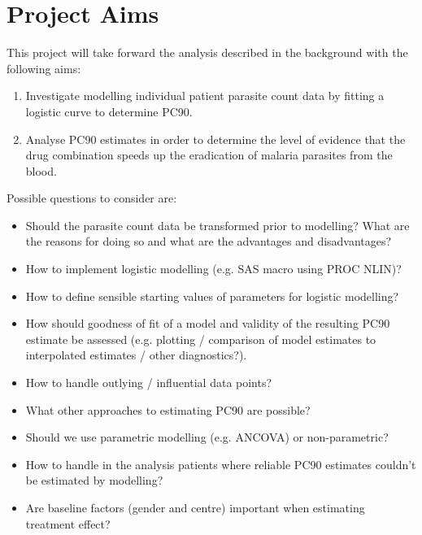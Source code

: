 \section*{Project Aims} 
This project will take forward the analysis described in the background with the following aims:
\begin{enumerate} 
\item Investigate modelling individual patient parasite count data by fitting a logistic curve to determine PC90. 
\item Analyse PC90 estimates in order to determine the level of evidence that the drug combination speeds up the eradication of malaria parasites from the blood.
\end{enumerate} 
Possible questions to consider are: 
\begin{itemize}
\item Should the parasite count data be transformed prior to modelling? What are the reasons for doing so and what are the advantages and disadvantages? 
\item How to implement logistic modelling (e.g. SAS macro using PROC NLIN)?  
\item How to define sensible starting values of parameters for logistic modelling? 
\item How should goodness of fit of a model and validity of the resulting PC90 estimate be assessed (e.g. plotting / comparison of model estimates to interpolated estimates / other diagnostics?). 
\item How to handle outlying / influential data points? 
\item What other approaches to estimating PC90 are possible? 
\item Should we use parametric modelling (e.g. ANCOVA) or non-parametric? 
\item How to handle in the analysis patients where reliable PC90 estimates couldn't be estimated by modelling? 
\item Are baseline factors (gender and centre) important when estimating treatment effect? 
\end{itemize}

